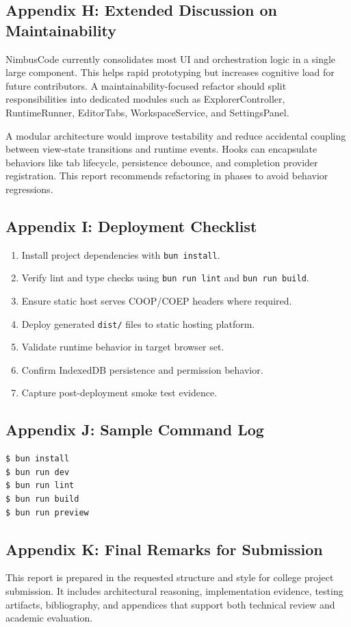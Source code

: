 \subsection*{Appendix H: Extended Discussion on Maintainability}
NimbusCode currently consolidates most UI and orchestration logic in a single large component. This helps rapid prototyping but increases cognitive load for future contributors. A maintainability-focused refactor should split responsibilities into dedicated modules such as ExplorerController, RuntimeRunner, EditorTabs, WorkspaceService, and SettingsPanel.

A modular architecture would improve testability and reduce accidental coupling between view-state transitions and runtime events. Hooks can encapsulate behaviors like tab lifecycle, persistence debounce, and completion provider registration. This report recommends refactoring in phases to avoid behavior regressions.

\newpage

\subsection*{Appendix I: Deployment Checklist}
\begin{enumerate}[leftmargin=8mm]
\item Install project dependencies with \texttt{bun install}.
\item Verify lint and type checks using \texttt{bun run lint} and \texttt{bun run build}.
\item Ensure static host serves COOP/COEP headers where required.
\item Deploy generated \texttt{dist/} files to static hosting platform.
\item Validate runtime behavior in target browser set.
\item Confirm IndexedDB persistence and permission behavior.
\item Capture post-deployment smoke test evidence.
\end{enumerate}

\subsection*{Appendix J: Sample Command Log}
\begin{lstlisting}[style=javascriptstyle,caption={Development Command Log Example}]
$ bun install
$ bun run dev
$ bun run lint
$ bun run build
$ bun run preview
\end{lstlisting}

\subsection*{Appendix K: Final Remarks for Submission}
This report is prepared in the requested structure and style for college project submission. It includes architectural reasoning, implementation evidence, testing artifacts, bibliography, and appendices that support both technical review and academic evaluation.


